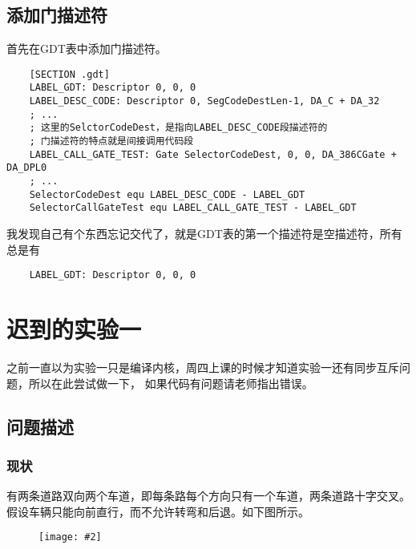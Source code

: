 \documentclass[a4paper,left=2.5cm,right=2.5cm,11pt]{article}
\newcommand{\sizedfic}[2]{\begin{figure}[H]
		\center
		\texttt{[image: \#2]}
	\end{figure}}
\begin{document}
\subsection{添加门描述符}
	首先在GDT表中添加门描述符。
	\begin{lstlisting}
	[SECTION .gdt]
	LABEL_GDT: Descriptor 0, 0, 0
	LABEL_DESC_CODE: Descriptor 0, SegCodeDestLen-1, DA_C + DA_32
	; ...
	; 这里的SelctorCodeDest，是指向LABEL_DESC_CODE段描述符的
	; 门描述符的特点就是间接调用代码段
	LABEL_CALL_GATE_TEST: Gate SelectorCodeDest, 0, 0, DA_386CGate + DA_DPL0
	; ...
	SelectorCodeDest equ LABEL_DESC_CODE - LABEL_GDT
	SelectorCallGateTest equ LABEL_CALL_GATE_TEST - LABEL_GDT
	\end{lstlisting}

	我发现自己有个东西忘记交代了，就是GDT表的第一个描述符是空描述符，所有总是有
	\begin{lstlisting}
	LABEL_GDT: Descriptor 0, 0, 0
	\end{lstlisting}




\clearpage

\section{迟到的实验一}
	之前一直以为实验一只是编译内核，周四上课的时候才知道实验一还有同步互斥问题，所以在此尝试做一下，
	如果代码有问题请老师指出错误。

\subsection{问题描述}
\subsubsection{现状}
	有两条道路双向两个车道，即每条路每个方向只有一个车道，两条道路十字交叉。
	假设车辆只能向前直行，而不允许转弯和后退。如下图所示。
	\sizedfic{0.5}{7.png}
\end{document}
